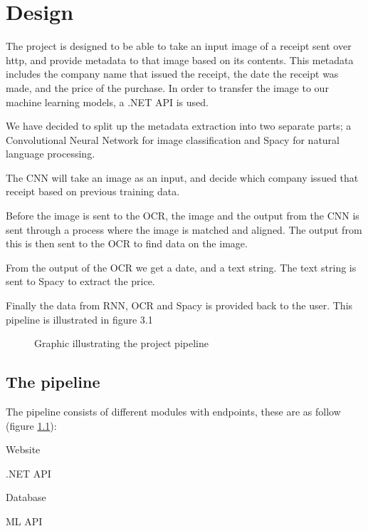 \chapter{Design}
\label{ch:design}

The project is designed to be able to take an input image of a receipt sent over http, and provide metadata to that image based on its contents.
This metadata includes the company name that issued the receipt, the date the receipt was made, and the price of the purchase.
In order to transfer the image to our machine learning models, a .NET API is used.

We have decided to split up the metadata extraction into two separate parts;
a Convolutional Neural Network for image classification and Spacy for natural language processing.

The CNN will take an image as an input, and decide which company issued that receipt based on previous training data.

Before the image is sent to the OCR, the image and the output from the CNN is sent through a process where the image is matched and aligned.
The output from this is then sent to the OCR to find data on the image.

From the output of the OCR we get a date, and a text string.
The text string is sent to Spacy to extract the price.

Finally the data from RNN, OCR and Spacy is provided back to the user.
This pipeline is illustrated in figure 3.1


\begin{figure}[h]
    \caption{Graphic illustrating the project pipeline}
    \label{fig:pipeline}
\end{figure}

\section{The pipeline}\label{sec:pipeline}

The pipeline consists of different modules with endpoints, these are as follow (figure \ref{fig:pipeline}):
\begin{compactitem}
    \item Website
    \item .NET API
    \item Database
    \item ML API\\
\end{compactitem}

